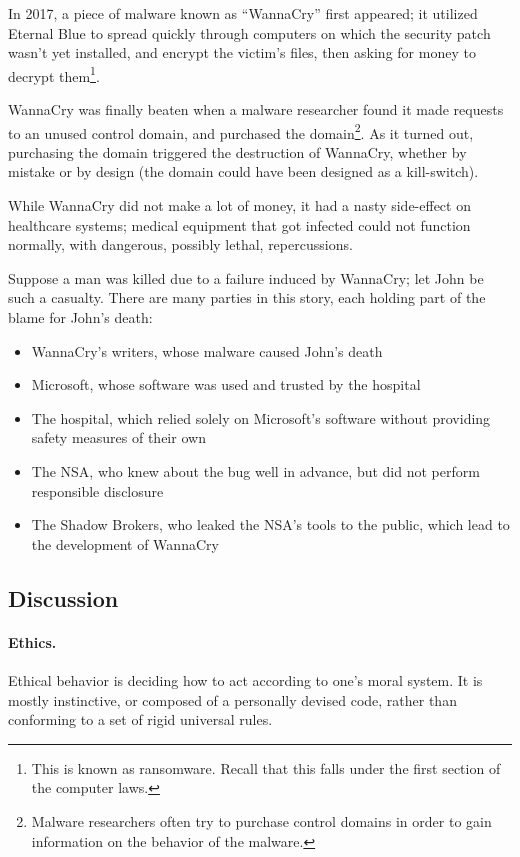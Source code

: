 In 2017, a piece of malware known as “WannaCry” first appeared; it utilized Eternal Blue to spread quickly through computers on which the security patch wasn't yet installed, and encrypt the victim’s files, then asking for money to decrypt them\footnote{This is known as ransomware. Recall that this falls under the first section of the computer laws.}.


WannaCry was finally beaten when a malware researcher found it made requests to an unused control domain, and purchased the domain\footnote{Malware researchers often try to purchase control domains in order to gain information on the behavior of the malware.}. As it turned out, purchasing the domain triggered the destruction of WannaCry, whether by mistake or by design (the domain could have been designed as a kill-switch).


While WannaCry did not make a lot of money, it had a nasty side-effect on healthcare systems; medical equipment that got infected could not function normally, with dangerous, possibly lethal, repercussions.


Suppose a man was killed due to a failure induced by WannaCry; let John be such a casualty. There are many parties in this story, each holding part of the blame for John’s death:
\begin{itemize}
    \item WannaCry’s writers, whose malware caused John’s death
    \item Microsoft, whose software was used and trusted by the hospital
    \item The hospital, which relied solely on Microsoft’s software without providing safety measures of their own
    \item The NSA, who knew about the bug well in advance, but did not perform responsible disclosure
    \item The Shadow Brokers, who leaked the NSA’s tools to the public, which lead to the development of WannaCry
\end{itemize}


\subsection{Discussion}
\paragraph{Ethics.} Ethical behavior is deciding how to act according to one’s moral system. It is mostly instinctive, or composed of a personally devised code, rather than conforming to a set of rigid universal rules.



